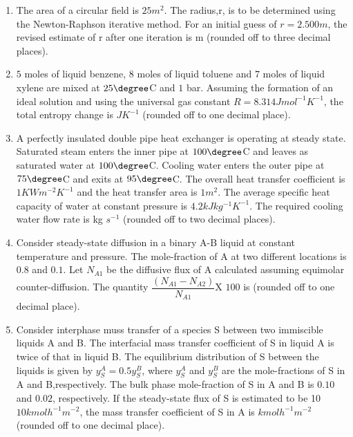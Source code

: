 \documentclass[journal]{IEEEtran}
\numberwithin{equation}{enumi}
\numberwithin{figure}{enumi}
\begin{document}
\begin{enumerate}[start=1, label={Q\arabic*.}]
  \item The area of a circular field is $25m^2$. The radius,r, is to be determined using the Newton-Raphson iterative method. For an initial guess of $r=2.500 m$, the revised estimate of r after one iteration is \underline{\hspace{1.5cm}}m (rounded off to three decimal places).
  \vspace{0.2cm}
  \item $5$ moles of liquid benzene, $8$ moles of liquid toluene and $7$ moles of liquid xylene are mixed at $25\degree$C and $1$ bar. Assuming the formation of an ideal solution and using the universal gas constant $R=8.314 J mol^{-1} K^{-1}$, the total entropy change is \underline{\hspace{1.5cm}}$J K^{-1}$ (rounded off to one decimal place).
\vspace{0.2cm}
  \item A perfectly insulated double pipe heat exchanger is operating at steady state. Saturated steam enters the inner pipe at $100\degree$C and leaves as saturated water at $100\degree$C. Cooling water enters the outer pipe at $75\degree$C and exits at $95\degree$C. The overall heat transfer coefficient is $1 KW m^{-2} K^{-1}$ and the heat transfer area is $1m^2$. The average specific heat capacity of water at constant pressure is $4.2kJ kg^{-1} K^{-1}$. The required cooling water flow rate is \underline{\hspace{1.5cm}}kg $s^{-1}$ (rounded off to two decimal places).
  \vspace{0.2cm}
  \item Consider steady-state diffusion in a binary A-B liquid at constant temperature and pressure. The mole-fraction of A at two different locations is $0.8$ and $0.1$. Let $N_{A1}$ be the diffusive flux of A calculated assuming equimolar counter-diffusion. The quantity $\dfrac{(N_{A1} - N_{A2})}{N_{A1}}$X $100$ is \underline{\hspace{1.5cm}} (rounded off to one decimal place).
\vspace{0.2cm}
  \item Consider interphase muss transfer of a species S between two immiscible liquids A and B. The interfacial mass transfer coefficient of S in liquid A is twice of that in liquid B. The equilibrium distribution of S between the liquids is given by $y_S^A=0.5y_S^B$, where $y_S^A$ and $y_S^B$ are the mole-fractions of S in A and B,respectively. The bulk phase mole-fraction of S in A and B is $0.10$ and $0.02$, respectively. If the steady-state flux of S is estimated to be 10 $10 kmol h^{-1}m^{-2}$, the mass transfer coefficient of S in A is \underline{\hspace{1.5cm}} $kmolh^{-1}m^{-2}$ (rounded off to one decimal place).

\end{enumerate}
\end{document}

